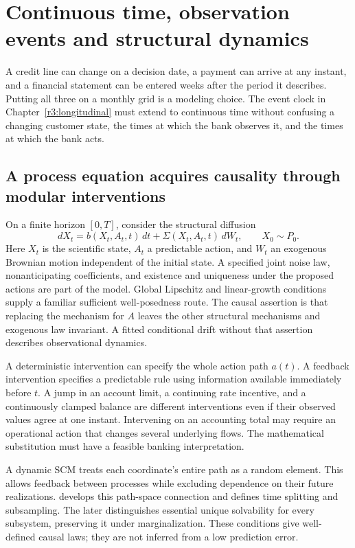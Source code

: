 \chapter{Continuous time, observation events and structural dynamics}
\label{r3:continuous}
A credit line can change on a decision date, a payment can arrive at any
instant, and a financial statement can be entered weeks after the period
it describes. Putting all three on a monthly grid is a modeling choice.
The event clock in Chapter~\ref{r3:longitudinal} must extend to continuous
time without confusing a changing customer state, the times at which the
bank observes it, and the times at which the bank acts.

\section{A process equation acquires causality through modular interventions}
\label{r3:dynamic-semantics}
On a finite horizon $[0,T]$, consider the structural diffusion
\begin{equation}
 dX_t=b(X_t,A_t,t)\,dt+\Sigma(X_t,A_t,t)\,dW_t,
 \qquad X_0\sim P_0.
 \label{r3:structural-diffusion}
\end{equation}
Here $X_t$ is the scientific state, $A_t$ a predictable action, and $W_t$
an exogenous Brownian motion independent of the initial state. A specified
joint noise law, nonanticipating coefficients, and existence and uniqueness
under the proposed actions are part of the model. Global Lipschitz and
linear-growth conditions supply a familiar sufficient well-posedness route.
The causal assertion is that replacing the mechanism for $A$ leaves the
other structural mechanisms and exogenous law invariant. A fitted
conditional drift without that assertion describes observational dynamics.

A deterministic intervention can specify the whole action path $a(t)$.
A feedback intervention specifies a predictable rule using information
available immediately before $t$. A jump in an account limit, a continuing
rate incentive, and a continuously clamped balance are different
interventions even if their observed values agree at one instant.
Intervening on an accounting total may require an operational action that
changes several underlying flows. The mathematical substitution must have
a feasible banking interpretation.

A dynamic SCM treats each coordinate's entire path as a random element.
This allows feedback between processes while excluding dependence on their
future realizations. \citet[Definitions 4--7 and Sections 4--5]{boeken2024}
develops this path-space connection and defines time splitting and
subsampling. The later \citet[Definitions 3--5 and Theorems 3, 5--6]{sde2026}
distinguishes essential unique solvability for every subsystem, preserving
it under marginalization. These conditions give well-defined causal
laws; they are not inferred from a low prediction error.

